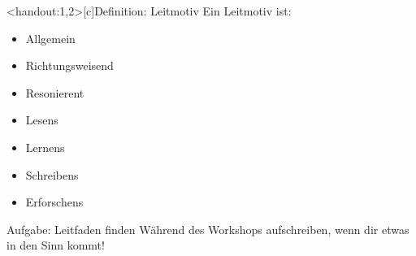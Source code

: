 \addtocounter{framenumber}{-1}
\begin{frame}<handout:1,2>[c]{Definition: Leitmotiv}
    \vspace{0.5cm}
    \large{
    Ein Leitmotiv ist:}
    \begin{itemize}[<+(1)->]
        \large
        \item Allgemein
        \item Richtungsweisend
        \item Resonierent
    \end{itemize}
    \pause
    \vspace{0.4cm}
    { 
      \addtocounter{framenumber}{1}
    }
    \begin{multicols}{2}
    \begin{itemize}[<+(1)->]
        \item Lesens
        \item Lernens
        \item Schreibens
        \item Erforschens
    \end{itemize}
    \end{multicols}
\end{frame}



\begin{frame}[c]
    \large
    \begin{block}{Aufgabe: Leitfaden finden}
    Während des Workshops aufschreiben, wenn dir etwas in den Sinn kommt!
    \end{block}
\end{frame}


%



